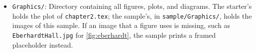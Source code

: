 \begin{itemize}
  \item \texttt{Graphics/}: Directory containing all figures, plots, and diagrams. The starter's holds the plot of \texttt{chapter2.tex}; the sample's, in \texttt{sample/Graphics/}, holds the images of this sample. If an image that a figure uses is missing, such as \texttt{EberhardtHall.jpg} for \cref{fig:eberhardt}, the sample prints a framed placeholder instead.
\end{itemize}
